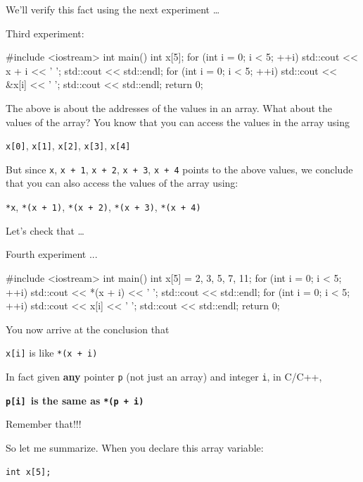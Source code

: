 We'll verify this fact using the next experiment \ldots{}

Third experiment:

\begin{consolethree}[escapeinside=||]
#include <iostream>
int main()
{
    int x[5];
    for (int i = 0; i < 5; ++i)
    {
        std::cout << x + i << ' ';
    }
    std::cout << std::endl;
    for (int i = 0; i < 5; ++i)
    {
        std::cout << &x[i] << ' ';
    }
    std::cout << std::endl;
    return 0;
}
\end{consolethree}

The above is about the addresses of the values in an array. What about
the values of the array? You know that you can access the values in the
array using

\texttt{x[0]}, \texttt{x[1]}, \texttt{x[2]}, \texttt{x[3]},
\texttt{x[4]}

But since \texttt{x}, \texttt{x + 1}, \texttt{x + 2}, \texttt{x + 3}, \texttt{x +
4} points to the above values, we conclude that you can also access the
values of the array using:

\texttt{*x}, \texttt{*(x + 1)}, \texttt{*(x + 2)}, \texttt{*(x + 3)}, \texttt{*(x
+ 4)}

Let's check that \ldots{}

Fourth experiment ...

\begin{consolethree}[escapeinside=||]
#include <iostream>
int main()
{
    int x[5] = {2, 3, 5, 7, 11};
    for (int i = 0; i < 5; ++i)
    {
        std::cout << *(x + i) << ' ';
    }
    std::cout << std::endl;
    for (int i = 0; i < 5; ++i)
    {
        std::cout << x[i] << ' ';
    }
    std::cout << std::endl;
    return 0;
}
\end{consolethree}

You now arrive at the conclusion that

\texttt{x[i]} is like \texttt{*(x + i)}

In fact given \textbf{any} pointer \texttt{p} (not just an array)
and integer \texttt{i}, in C/C++,

\texttt{\textbf{p[i] }}\textbf{is the same as }\texttt{\textbf{*(p +
i)}}

Remember that!!!

So let me summarize. When you declare this array variable:

\verb!int x[5];!

